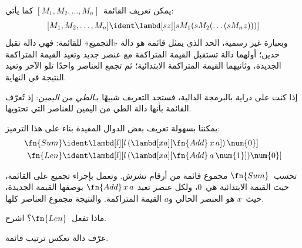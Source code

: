 \documentclass[../../../include/open-logic-section]{subfiles}
\begin{document}

يمكن تعريف القائمة~$[M_1, M_2, \ldots, M_n]$ كما يأتي:
\[
  [M_1, M_2, \ldots, M_n] \ident \lambd[sz][s M_1 (s M_2 (\ldots (s M_n z)))]
\]
وبعبارة غير رسمية، الحد الذي يمثل قائمة هو دالة «التجميع» للقائمة:
فهي دالة تقبل حدين؛ أولهما دالة تستقبل القيمة المتراكمة مع عنصر جديد
وتعيد القيمة المتراكمة الجديدة، وثانيهما القيمة المتراكمة الابتدائية؛
ثم تجمع العناصر واحدًا تلو الآخر وتعيد النتيجة في النهاية.

\begin{digress}
  إذا كنت على دراية بالبرمجة الدالية، فستجد التعريف شبيهًا
  بـ\emph{الطي من اليمين}: إذ تُعرّف القائمة بأنها دالة الطي من اليمين
  للعناصر التي تحتويها.
\end{digress}

يمكننا بسهولة تعريف بعض الدوال المفيدة بناء على هذا الترميز:
\begin{align*}
  \fn{Sum} & \ident
  \lambd[l][l \, (\lambd[xa][\fn{Add} \, x \, a])\,  \num{0}]\\
  \fn{Len} & \ident
  \lambd[l][l \, (\lambd[xa][\fn{Add} \, a \, \num{1}]) \num{0}]
\end{align*}

تحسب~$\fn{Sum}$ مجموع قائمة من أرقام تشرش. وتعمل بإجراء تجميع على
القائمة، حيث القيمة الابتدائية هي~$\num{0}$، ولكل عنصر تعيد
$\fn{Add} \, x\, a$ بوصفها القيمة الجديدة، حيث~$x$ هو العنصر الحالي
و$a$ القيمة المتراكمة. والنتيجة مجموع العناصر كلها.

\begin{prob}
  ماذا تفعل~$\fn{Len}$؟ اشرح.
\end{prob}

\begin{prob}
  عرّف دالة تعكس ترتيب قائمة.
\end{prob}
\end{document}
